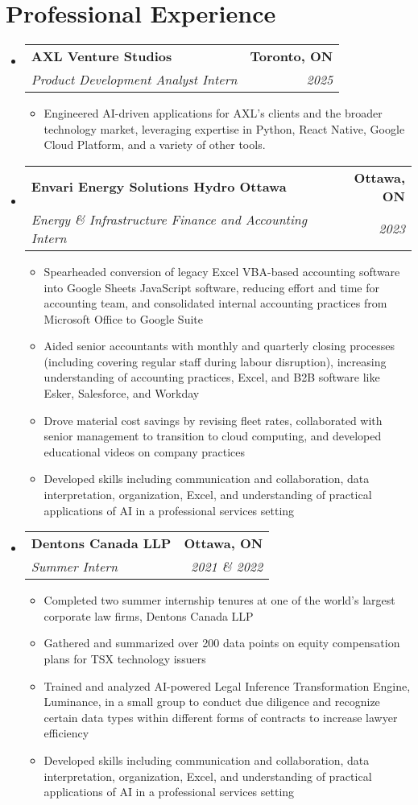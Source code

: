 \documentclass[letterpaper,10pt]{article}
\makeatletter
\newcommand{\resumeItem}[1]{
  \item\small{
    {#1 \vspace{-2pt}}
  }
}
\newcommand{\resumeSubheading}[4]{
  \vspace{-2pt}\item
    \begin{tabular*}{1.0\textwidth}[t]{l@{\extracolsep{\fill}}r}
      \textbf{#1} & \textbf{\small #2} \\
      \textit{\small#3} & \textit{\small #4} \\
    \end{tabular*}\vspace{-7pt}
}
\newcommand{\resumeSubHeadingListStart}{\begin{itemize}[leftmargin=0.0in, label={}]}
\newcommand{\resumeSubHeadingListEnd}{\end{itemize}}
\newcommand{\resumeItemListStart}{\begin{itemize}[label=--]}
\newcommand{\resumeItemListEnd}{\end{itemize}\vspace{-5pt}}
\makeatother
\begin{document}
\section{Professional Experience}
  \resumeSubHeadingListStart
    \resumeSubheading
      {AXL Venture Studios}{Toronto, ON}
      {Product Development Analyst Intern}{2025}
      \resumeItemListStart
        \resumeItem{Engineered AI-driven applications for AXL's clients and the broader technology market, leveraging expertise in Python, React Native, Google Cloud Platform, and a variety of other tools.}
      \resumeItemListEnd
    \resumeSubheading
      {Envari Energy Solutions \textbar{} Hydro Ottawa}{Ottawa, ON}
      {Energy \& Infrastructure Finance and Accounting Intern}{2023}
      \resumeItemListStart
        \resumeItem{Spearheaded conversion of legacy Excel VBA-based accounting software into Google Sheets JavaScript software, reducing effort and time for accounting team, and consolidated internal accounting practices from Microsoft Office to Google Suite}
        \resumeItem{Aided senior accountants with monthly and quarterly closing processes (including covering regular staff during labour disruption), increasing understanding of accounting practices, Excel, and B2B software like Esker, Salesforce, and Workday}
        \resumeItem{Drove material cost savings by revising fleet rates, collaborated with senior management to transition to cloud computing, and developed educational videos on company practices}
        \resumeItem{Developed skills including communication and collaboration, data interpretation, organization, Excel, and understanding of practical applications of AI in a professional services setting}
      \resumeItemListEnd
    \resumeSubheading
      {Dentons Canada LLP}{Ottawa, ON}
      {Summer Intern}{2021 \& 2022}
      \resumeItemListStart
        \resumeItem{Completed two summer internship tenures at one of the world's largest corporate law firms, Dentons Canada LLP}
        \resumeItem{Gathered and summarized over 200 data points on equity compensation plans for TSX technology issuers}
        \resumeItem{Trained and analyzed AI-powered Legal Inference Transformation Engine, Luminance, in a small group to conduct due diligence and recognize certain data types within different forms of contracts to increase lawyer efficiency}
        \resumeItem{Developed skills including communication and collaboration, data interpretation, organization, Excel, and understanding of practical applications of AI in a professional services setting}
      \resumeItemListEnd
  \resumeSubHeadingListEnd
\end{document}

